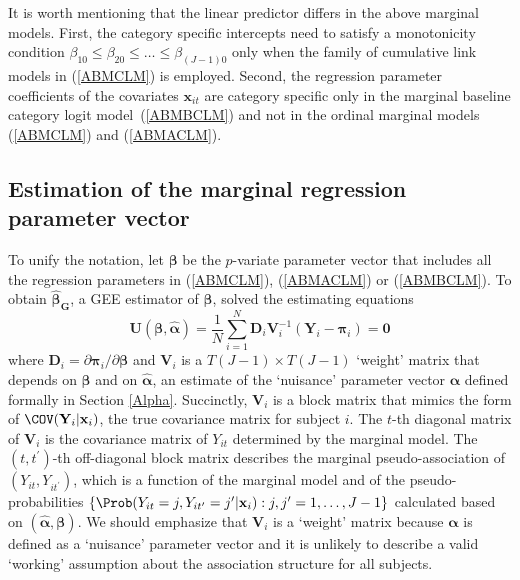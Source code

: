 \documentclass[article,shortnames,nojss]{jss}
\begin{document}
It is worth mentioning that the linear predictor differs in the above marginal models. First, the category specific intercepts need to satisfy a monotonicity condition $\beta_{10}\leq\beta_{20}\leq \ldots \leq \beta_{(J-1)0}$ only when the family of cumulative link models in (\ref{ABMCLM}) is employed. Second, the regression parameter coefficients of the covariates $\mathbf x_{it}$ are category specific only in the marginal baseline category logit model~(\ref{ABMBCLM}) and not in the ordinal marginal models (\ref{ABMCLM}) and (\ref{ABMACLM}).

\subsection{Estimation of the marginal regression parameter vector}
To unify the notation, let $\boldsymbol \beta$ be the $p$-variate parameter vector that includes all the regression parameters in (\ref{ABMCLM}), (\ref{ABMACLM}) or (\ref{ABMBCLM}). To obtain $\boldsymbol {\widehat \beta_G}$, a GEE estimator of $\boldsymbol \beta$, \cite{Touloumis2012} solved the estimating equations
\begin{equation}
\mathbf{U}(\boldsymbol \beta,\widehat{\boldsymbol \alpha})=\frac{1}{N}\sum_{i=1}^N \mathbf{D}_i \mathbf V^{-1}_{i} (\mathbf {Y}_i-\boldsymbol{\pi}_i)=\mathbf{0}
\label{EEbeta}
\end{equation} 
where $\mathbf{D}_i=\partial \boldsymbol{\pi}_i/\partial \boldsymbol{\beta}$ and $\mathbf V_i$ is a $T(J-1) \times T(J-1)$ `weight' matrix that depends on $\boldsymbol \beta$ and on $\widehat{\boldsymbol \alpha}$, an estimate of the `nuisance' parameter vector $\boldsymbol \alpha$ defined formally in Section \ref{Alpha}. Succinctly, $\mathbf V_i$ is a block matrix that mimics the form of $\COV(\mathbf{Y}_i|\mathbf x_i)$, the true covariance matrix for subject $i$. The $t$-th diagonal matrix of $\mathbf V_i$ is the covariance matrix of $Y_{it}$ determined by the marginal model. The $(t,t^{\prime})$-th off-diagonal block matrix describes the marginal pseudo-association of $(Y_{it},Y_{it^{\prime}})$, which is a function of the marginal model and of the pseudo-probabilities $\{\Prob(Y_{it}=j,Y_{it^{\prime}}=j^{\prime}|\mathbf x_i):j,j^{\prime}=1,\ldots,J-1\}$ calculated based on $(\widehat{\boldsymbol \alpha},\boldsymbol \beta)$. We should emphasize that $\mathbf V_i$ is a `weight' matrix because $\boldsymbol \alpha$ is defined as a `nuisance' parameter vector and it is unlikely to describe a valid `working' assumption about the association structure for all subjects.
\end{document}
